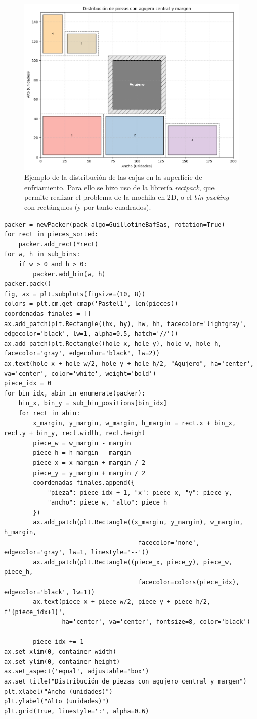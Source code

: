 \begin{figure}[H]
    \centering
    \includegraphics[width=0.6\linewidth]{figuras/ejemplo_packaging.png}
    \caption[Ejempplo distribución de superficie]{Ejemplo de la distribución de las cajas en la superficie de enfriamiento. Para ello se hizo uso de la librería \textit{rectpack}, que permite realizar el problema de la mochila en 2D, o el \textit{bin packing} con rectángulos (y por tanto cuadrados).}
    \label{fig:ejemplopackaging}
\end{figure}
%
\begin{lstlisting}[caption={Código de implementación del problema de distribución de piezas.}, label={distribucion_piezas}]
    packer = newPacker(pack_algo=GuillotineBafSas, rotation=True)
for rect in pieces_sorted:
    packer.add_rect(*rect)
for w, h in sub_bins:
    if w > 0 and h > 0:
        packer.add_bin(w, h)
packer.pack()
fig, ax = plt.subplots(figsize=(10, 8))
colors = plt.cm.get_cmap('Pastel1', len(pieces))
coordenadas_finales = []
ax.add_patch(plt.Rectangle((hx, hy), hw, hh, facecolor='lightgray', edgecolor='black', lw=1, alpha=0.5, hatch='//'))
ax.add_patch(plt.Rectangle((hole_x, hole_y), hole_w, hole_h, facecolor='gray', edgecolor='black', lw=2))
ax.text(hole_x + hole_w/2, hole_y + hole_h/2, "Agujero", ha='center', va='center', color='white', weight='bold')
piece_idx = 0
for bin_idx, abin in enumerate(packer):
    bin_x, bin_y = sub_bin_positions[bin_idx]
    for rect in abin:
        x_margin, y_margin, w_margin, h_margin = rect.x + bin_x, rect.y + bin_y, rect.width, rect.height
        piece_w = w_margin - margin
        piece_h = h_margin - margin
        piece_x = x_margin + margin / 2
        piece_y = y_margin + margin / 2
        coordenadas_finales.append({
            "pieza": piece_idx + 1, "x": piece_x, "y": piece_y,
            "ancho": piece_w, "alto": piece_h
        })
        ax.add_patch(plt.Rectangle((x_margin, y_margin), w_margin, h_margin,
                                     facecolor='none', edgecolor='gray', lw=1, linestyle='--'))
        ax.add_patch(plt.Rectangle((piece_x, piece_y), piece_w, piece_h,
                                     facecolor=colors(piece_idx), edgecolor='black', lw=1))
        ax.text(piece_x + piece_w/2, piece_y + piece_h/2, f'{piece_idx+1}', 
                ha='center', va='center', fontsize=8, color='black')
        
        piece_idx += 1
ax.set_xlim(0, container_width)
ax.set_ylim(0, container_height)
ax.set_aspect('equal', adjustable='box')
ax.set_title("Distribución de piezas con agujero central y margen")
plt.xlabel("Ancho (unidades)")
plt.ylabel("Alto (unidades)")
plt.grid(True, linestyle=':', alpha=0.6)
\end{lstlisting}
%
%
